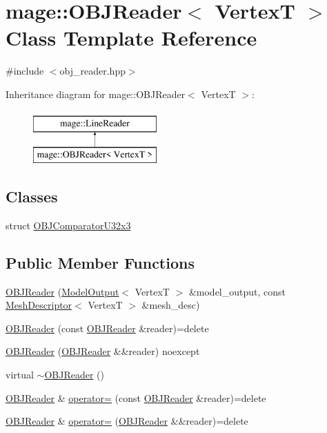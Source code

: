 \hypertarget{classmage_1_1_o_b_j_reader}{}\section{mage\+:\+:O\+B\+J\+Reader$<$ VertexT $>$ Class Template Reference}
\label{classmage_1_1_o_b_j_reader}


{\ttfamily \#include $<$obj\+\_\+reader.\+hpp$>$}

Inheritance diagram for mage\+:\+:O\+B\+J\+Reader$<$ VertexT $>$\+:\begin{figure}[H]
\begin{center}
\leavevmode
\includegraphics[height=2.000000cm]{classmage_1_1_o_b_j_reader}
\end{center}
\end{figure}
\subsection*{Classes}
\begin{DoxyCompactItemize}
\item 
struct \hyperlink{structmage_1_1_o_b_j_reader_1_1_o_b_j_comparator_u32x3}{O\+B\+J\+Comparator\+U32x3}
\end{DoxyCompactItemize}
\subsection*{Public Member Functions}
\begin{DoxyCompactItemize}
\item 
\hyperlink{classmage_1_1_o_b_j_reader_a87c63bd4beb00ce03be5395a37d2a0ac}{O\+B\+J\+Reader} (\hyperlink{structmage_1_1_model_output}{Model\+Output}$<$ VertexT $>$ \&model\+\_\+output, const \hyperlink{structmage_1_1_mesh_descriptor}{Mesh\+Descriptor}$<$ VertexT $>$ \&mesh\+\_\+desc)
\item 
\hyperlink{classmage_1_1_o_b_j_reader_a8864bc1ca0520bf90e216415db772bbb}{O\+B\+J\+Reader} (const \hyperlink{classmage_1_1_o_b_j_reader}{O\+B\+J\+Reader} \&reader)=delete
\item 
\hyperlink{classmage_1_1_o_b_j_reader_a67b39c51aaeaeb7b7b6f1a6df850000e}{O\+B\+J\+Reader} (\hyperlink{classmage_1_1_o_b_j_reader}{O\+B\+J\+Reader} \&\&reader) noexcept
\item 
virtual \hyperlink{classmage_1_1_o_b_j_reader_ad1ff7472ec560a29fe58b594d84dc43e}{$\sim$\+O\+B\+J\+Reader} ()
\item 
\hyperlink{classmage_1_1_o_b_j_reader}{O\+B\+J\+Reader} \& \hyperlink{classmage_1_1_o_b_j_reader_a62e516060267f828c5aa1a3f23dcf55d}{operator=} (const \hyperlink{classmage_1_1_o_b_j_reader}{O\+B\+J\+Reader} \&reader)=delete
\item 
\hyperlink{classmage_1_1_o_b_j_reader}{O\+B\+J\+Reader} \& \hyperlink{classmage_1_1_o_b_j_reader_ac795c3b1d19ecf38735b76bc5b97fa80}{operator=} (\hyperlink{classmage_1_1_o_b_j_reader}{O\+B\+J\+Reader} \&\&reader)=delete
\end{DoxyCompactItemize}

